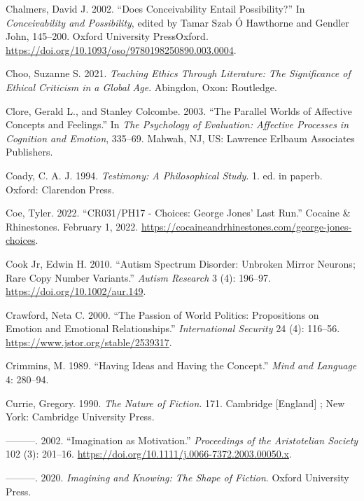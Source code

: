 \documentclass[12pt]{book}
\newenvironment{CSLReferences}%
  {\setlength{\parindent}{0pt}%
   \setlength{\leftskip}{0pt}%
   \setlength{\parskip}{0pt}}%
  {\par}
\theoremstyle{definition}
\theoremstyle{remark}
\begin{document}
\begin{CSLReferences}{1}{0}
Chalmers, David J. 2002. {``Does {Conceivability Entail Possibility}?''} In \emph{Conceivability and {Possibility}}, edited by Tamar Szab Ó Hawthorne and Gendler John, 145--200. Oxford University PressOxford. \url{https://doi.org/10.1093/oso/9780198250890.003.0004}.

Choo, Suzanne S. 2021. \emph{Teaching Ethics Through Literature: The Significance of Ethical Criticism in a Global Age}. Abingdon, Oxon: Routledge.

Clore, Gerald L., and Stanley Colcombe. 2003. {``The Parallel Worlds of Affective Concepts and Feelings.''} In \emph{The Psychology of Evaluation: {Affective} Processes in Cognition and Emotion}, 335--69. Mahwah, NJ, US: Lawrence Erlbaum Associates Publishers.

Coady, C. A. J. 1994. \emph{Testimony: A Philosophical Study}. 1. ed. in paperb. Oxford: Clarendon Press.

Coe, Tyler. 2022. {``{CR031}/{PH17} - {Choices}: {George Jones}' {Last Run}.''} Cocaine \& Rhinestones. February 1, 2022. \url{https://cocaineandrhinestones.com/george-jones-choices}.

Cook Jr, Edwin H. 2010. {``Autism Spectrum Disorder: Unbroken Mirror Neurons; Rare Copy Number Variants.''} \emph{Autism Research} 3 (4): 196--97. \url{https://doi.org/10.1002/aur.149}.

Crawford, Neta C. 2000. {``The Passion of World Politics: Propositions on Emotion and Emotional Relationships.''} \emph{International Security} 24 (4): 116--56. \url{https://www.jstor.org/stable/2539317}.

Crimmins, M. 1989. {``Having Ideas and Having the Concept.''} \emph{Mind and Language} 4: 280--94.

Currie, Gregory. 1990. \emph{The Nature of Fiction}. 171. Cambridge {[}England{]} ; New York: Cambridge University Press.

---------. 2002. {``Imagination as Motivation.''} \emph{Proceedings of the Aristotelian Society} 102 (3): 201--16. \url{https://doi.org/10.1111/j.0066-7372.2003.00050.x}.

---------. 2020. \emph{Imagining and Knowing: The Shape of Fiction}. Oxford University Press.


\end{CSLReferences}
\end{document}
